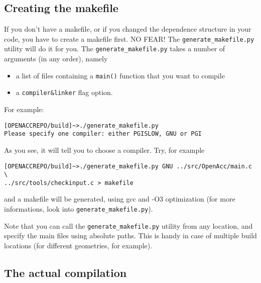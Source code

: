 \subsection{Creating the makefile}
If you don't have a makefile, or if you changed the dependence
structure in your code, you have to create a makefile first. NO FEAR! The 
\verb|generate_makefile.py| utility will do it for you.
The \verb|generate_makefile.py| takes a number of arguments (in any order), 
namely 
\begin{itemize}
    \item a list of files containing a \verb|main()| function that you want to 
        compile
    \item a \verb|compiler&linker| flag option.
\end{itemize}
For example:
\begin{verbatim}
[OPENACCREPO/build]~>./generate_makefile.py
Please specify one compiler: either PGISLOW, GNU or PGI
\end{verbatim}
As you see, it will tell you to choose a compiler. Try, for example
\begin{verbatim}
[OPENACCREPO/build]~>./generate_makefile.py GNU ../src/OpenAcc/main.c \
../src/tools/checkinput.c > makefile
\end{verbatim}
and a makefile will be generated, using gcc and -O3 optimization
(for more informations, look into \verb|generate_makefile.py|). 

Note that you can call the \verb|generate_makefile.py| utility from any 
location, and specify the main files using absolute paths. This is handy in 
case of multiple build locations (for different geometries, for example).


\subsection{The actual compilation}

